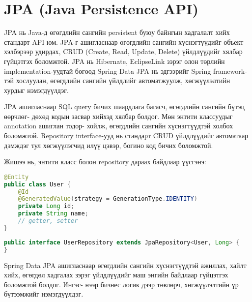 \section{JPA (Java Persistence API)}
JPA нь Java-д өгөгдлийн сангийн persistent буюу байнгын хадгалалт хийх стандарт API юм. JPA-г ашигласнаар өгөгдлийн сангийн хүснэгтүүдийг объект хэлбэрээр удирдах, CRUD (Create, Read, Update, Delete) үйлдлүүдийг хялбар гүйцэтгэх боломжтой. JPA нь Hibernate, EclipseLink зэрэг олон төрлийн implementation-уудтай бөгөөд Spring Data JPA нь эдгээрийг Spring framework-тэй хослуулан, өгөгдлийн сангийн үйлдлийг автоматжуулж, хөгжүүлэлтийн хурдыг нэмэгдүүлдэг.

JPA ашигласнаар SQL query бичих шаардлага багасч, өгөгдлийн сангийн бүтэц өөрчлөг- дөхөд кодын засвар хийхэд хялбар болдог. Мөн энтити классуудыг annotation ашиглан тодор- хойлж, өгөгдлийн сангийн хүснэгтүүдтэй холбох боломжтой. Repository interface-ууд нь стандарт CRUD үйлдлүүдийг автоматаар дэмждэг тул хөгжүүлэгчид илүү цэвэр, богино код бичих боломжтой.

Жишээ нь, энтити класс болон repository дараах байдлаар үүсгэнэ:

\begin{lstlisting}[language=Java, caption=JPA Entity, frame=single]
@Entity
public class User {
	@Id
	@GeneratedValue(strategy = GenerationType.IDENTITY)
	private Long id;
	private String name;
	// getter, setter
}
\end{lstlisting}

\begin{lstlisting}[language=Java, caption=Spring Data JPA Repository, frame=single]
public interface UserRepository extends JpaRepository<User, Long> {
}
\end{lstlisting}

Spring Data JPA ашигласнаар өгөгдлийн сангийн хүснэгтүүдтэй ажиллах, хайлт хийх, өгөгдөл хадгалах зэрэг үйлдлүүдийг маш энгийн байдлаар гүйцэтгэх боломжтой болдог. Ингэс- нээр бизнес логик дээр төвлөрч, хөгжүүлэлтийн үр бүтээмжийг нэмэгдүүлдэг.

